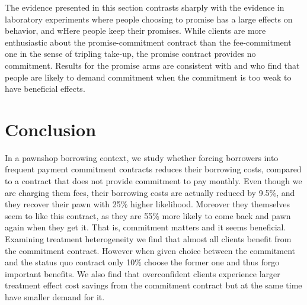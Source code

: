 \documentclass[oneside,11pt]{article}
\begin{document}
\vspace{.2in}
\noindent The evidence presented in this section contrasts sharply with the evidence in laboratory experiments where people choosing to promise has a large effects on behavior, and wHere people keep their promises. While clients are more enthusiastic about the promise-commitment contract than the fee-commitment one in the sense of tripling take-up, the promise contract provides no commitment. Results for the promise arms are consistent with \cite{Ted} and \cite{John} who find that people are likely to demand commitment when the commitment is too weak to have beneficial effects.
   
   


    
\section{Conclusion} \label{conclusion}

In a pawnshop borrowing context, we study whether forcing borrowers into frequent payment commitment contracts reduces their borrowing costs, compared to a contract that does not provide commitment to pay monthly. Even though we are charging them fees, their borrowing costs are actually reduced by 9.5\%, and they recover their pawn with 25\% higher likelihood. Moreover they themselves seem to like this contract, as they are 55\% more likely to come back and pawn again when they get it. That is, commitment matters and it seems beneficial. Examining treatment heterogeneity we find that almost all clients benefit from the commitment contract. However when given choice between the commitment and the status quo contract only 10\% choose the former one and thus forgo important benefits. We also find that overconfident clients experience larger treatment effect cost savings from the commitment contract but at the same time have smaller demand for it. 
\end{document}
